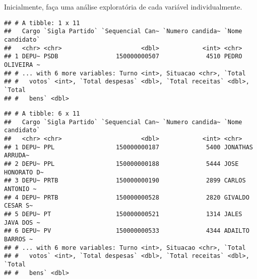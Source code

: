 \documentclass[]{article}
\newenvironment{Shaded}{\begin{snugshade}}{\end{snugshade}}
\newcommand{\KeywordTok}[1]{\textcolor[rgb]{0.13,0.29,0.53}{\textbf{#1}}}
\newcommand{\DataTypeTok}[1]{\textcolor[rgb]{0.13,0.29,0.53}{#1}}
\newcommand{\DecValTok}[1]{\textcolor[rgb]{0.00,0.00,0.81}{#1}}
\newcommand{\StringTok}[1]{\textcolor[rgb]{0.31,0.60,0.02}{#1}}
\newcommand{\OperatorTok}[1]{\textcolor[rgb]{0.81,0.36,0.00}{\textbf{#1}}}
\newcommand{\NormalTok}[1]{#1}
\begin{document}
Inicialmente, faça uma análise exploratória de cada variável
individualmente.

\begin{Shaded}
\end{Shaded}

\begin{verbatim}
## # A tibble: 1 x 11
##   Cargo `Sigla Partido` `Sequencial Can~ `Numero candida~ `Nome candidato`
##   <chr> <chr>                      <dbl>            <int> <chr>           
## 1 DEPU~ PSDB                150000000507             4510 PEDRO OLIVEIRA ~
## # ... with 6 more variables: Turno <int>, Situacao <chr>, `Total
## #   votos` <int>, `Total despesas` <dbl>, `Total receitas` <dbl>, `Total
## #   bens` <dbl>
\end{verbatim}

\begin{Shaded}
\end{Shaded}

\begin{verbatim}
## # A tibble: 6 x 11
##   Cargo `Sigla Partido` `Sequencial Can~ `Numero candida~ `Nome candidato`
##   <chr> <chr>                      <dbl>            <int> <chr>           
## 1 DEPU~ PPL                 150000000187             5400 JONATHAS ARRUDA~
## 2 DEPU~ PPL                 150000000188             5444 JOSE HONORATO D~
## 3 DEPU~ PRTB                150000000190             2899 CARLOS ANTONIO ~
## 4 DEPU~ PRTB                150000000528             2820 GIVALDO CESAR S~
## 5 DEPU~ PT                  150000000521             1314 JALES JAVA DOS ~
## 6 DEPU~ PV                  150000000533             4344 ADAILTO BARROS ~
## # ... with 6 more variables: Turno <int>, Situacao <chr>, `Total
## #   votos` <int>, `Total despesas` <dbl>, `Total receitas` <dbl>, `Total
## #   bens` <dbl>
\end{verbatim}

\begin{Shaded}
\end{Shaded}
\end{document}
